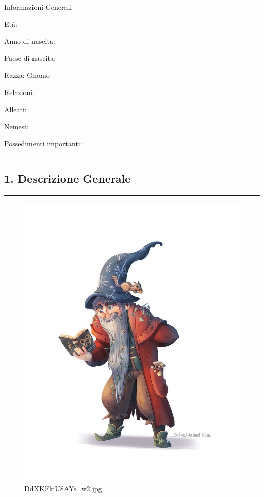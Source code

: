 Informazioni Generali

Età:

Anno di nascita:

Paese di nascita:

Razza: Gnomo

Relazioni:

Alleati:

Nemesi:

Possedimenti importanti:

\begin{center}\rule{0.5\linewidth}{0.5pt}\end{center}

\subsection{1. Descrizione Generale}\label{descrizione-generale}

\begin{center}\rule{0.5\linewidth}{0.5pt}\end{center}

\begin{figure}
\centering
\includegraphics{DdXKFkiU8AYs_w2.jpg}
\caption{DdXKFkiU8AYs\_w2.jpg}
\end{figure}

